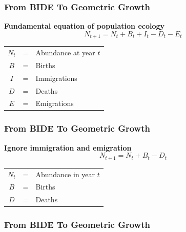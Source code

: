 \documentclass[color=usenames,dvipsnames]{beamer}\usepackage[]{graphicx}\usepackage[]{color}
\begin{document}
\begin{frame}
  \frametitle{From {\color{red} BIDE} To Geometric Growth}
  {\bf \large Fundamental equation of population ecology}
  \[
  N_{t+1} = N_t + B_t + I_t - D_t - E_t
  \]
  \vspace{0.5cm}
  \begin{tabular}{ccl}
    $N_t$ & = & Abundance at year $t$ \\
    {\color{red} $B$}    & = & Births       \\
    {\color{red} $I$}    & = & Immigrations \\
    {\color{red} $D$}    & = & Deaths       \\
    {\color{red} $E$}    & = & Emigrations \\
  \end{tabular}
\end{frame}


\begin{frame}
  \frametitle{From {\color{red} BIDE} To Geometric Growth}
  {\bf \large Ignore immigration and emigration}
  \[
  N_{t+1} = N_t + B_t - D_t
  \]
  \vspace{0.5cm}
  \begin{tabular}{ccl}
    $N_t$ & = & Abundance in year $t$ \\
    {\color{red} $B$}    & = & Births       \\
    {\color{red} $D$}    & = & Deaths       \\
  \end{tabular}
\end{frame}


\begin{frame}
  \frametitle{From {\color{red} BIDE} To Geometric Growth}
\end{frame}
\end{document}
